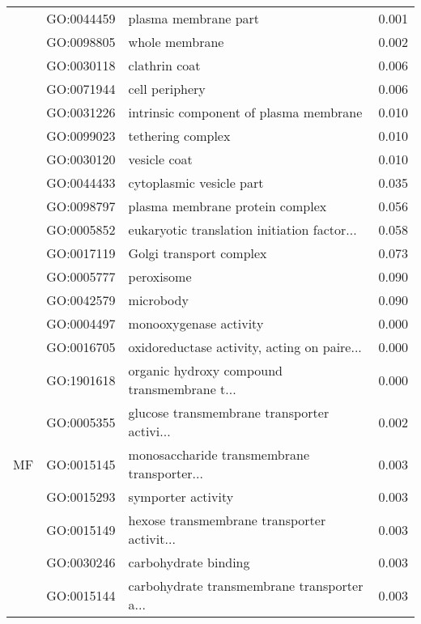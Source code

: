 \begin{longtable}{lllr}
   & GO:0044459 &                         plasma membrane part &         0.001 \\
   & GO:0098805 &                               whole membrane &         0.002 \\
   & GO:0030118 &                                clathrin coat &         0.006 \\
   & GO:0071944 &                               cell periphery &         0.006 \\
   & GO:0031226 &       intrinsic component of plasma membrane &         0.010 \\
   & GO:0099023 &                            tethering complex &         0.010 \\
   & GO:0030120 &                                 vesicle coat &         0.010 \\
   & GO:0044433 &                     cytoplasmic vesicle part &         0.035 \\
   & GO:0098797 &              plasma membrane protein complex &         0.056 \\
   & GO:0005852 &  eukaryotic translation initiation factor... &         0.058 \\
   & GO:0017119 &                      Golgi transport complex &         0.073 \\
   & GO:0005777 &                                   peroxisome &         0.090 \\
   & GO:0042579 &                                    microbody &         0.090 \\
\cline{1-4}
\multirow{42}{*}{MF} & GO:0004497 &                       monooxygenase activity &         0.000 \\
   & GO:0016705 &  oxidoreductase activity, acting on paire... &         0.000 \\
   & GO:1901618 &  organic hydroxy compound transmembrane t... &         0.000 \\
   & GO:0005355 &  glucose transmembrane transporter activi... &         0.002 \\
   & GO:0015145 &  monosaccharide transmembrane transporter... &         0.003 \\
   & GO:0015293 &                           symporter activity &         0.003 \\
   & GO:0015149 &  hexose transmembrane transporter activit... &         0.003 \\
   & GO:0030246 &                         carbohydrate binding &         0.003 \\
   & GO:0015144 &  carbohydrate transmembrane transporter a... &         0.003 \\

\end{longtable}
